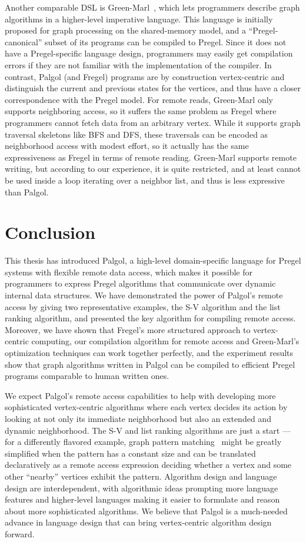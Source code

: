 \documentclass{sokendai_thesis} %
\begin{document}
Another comparable DSL is Green-Marl~\cite{green12}, which lets programmers describe graph algorithms in a higher-level imperative language.
This language is initially proposed for graph processing on the shared-memory model, and a ``Pregel-canonical'' subset of its programs can be compiled to Pregel.
Since it does not have a Pregel-specific language design, programmers may easily get compilation errors if they are not familiar with the implementation of the compiler.
In contrast, Palgol (and Fregel) programs are by construction vertex-centric and distinguish the current and previous states for the vertices, and thus have a closer correspondence with the Pregel model.
For remote reads, Green-Marl only supports neighboring access, so it suffers the same problem as Fregel where programmers cannot fetch data from an arbitrary vertex.
While it supports graph traversal skeletons like BFS and DFS, these traversals can be encoded as neighborhood access with modest effort, so it actually has the same expressiveness as Fregel in terms of remote reading.
Green-Marl supports remote writing, but according to our experience, it is quite restricted, and at least cannot be used inside a loop iterating over a neighbor list, and thus is less expressive than Palgol.

\chapter{Conclusion}
\label{sec:conclusions}

This thesis has introduced Palgol, a high-level domain-specific language for Pregel systems with flexible remote data access, which makes it possible for programmers to express Pregel algorithms that communicate over dynamic internal data structures.
We have demonstrated the power of Palgol's remote access by giving two representative examples, the S-V algorithm and the list ranking algorithm, and presented the key algorithm for compiling remote access.
Moreover, we have shown that Fregel's more structured approach to vertex-centric computing, our compilation algorithm for remote access and Green-Marl's optimization techniques can work together perfectly, and the experiment results show that graph algorithms written in Palgol can be compiled to efficient Pregel programs comparable to human written ones.

We expect Palgol's remote access capabilities to help with developing more sophisticated vertex-centric algorithms where each vertex decides its action by looking at not only its immediate neighborhood but also an extended and dynamic neighborhood.
The S-V and list ranking algorithms are just a start --- for a differently flavored example, graph pattern matching~\cite{graphpm} might be greatly simplified when the pattern has a constant size and can be translated declaratively as a remote access expression deciding whether a vertex and some other ``nearby'' vertices exhibit the pattern.
Algorithm design and language design are interdependent, with algorithmic ideas prompting more language features and higher-level languages making it easier to formulate and reason about more sophisticated algorithms.
We believe that Palgol is a much-needed advance in language design that can bring vertex-centric algorithm design forward.
\end{document}
